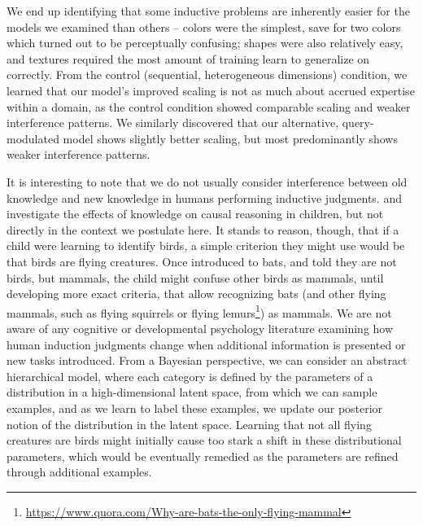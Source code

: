 We end up identifying that some inductive problems are inherently easier for the models we examined than others -- colors were the simplest, save for two colors which turned out to be perceptually confusing; shapes were also relatively easy, and textures required the most amount of training learn to generalize on correctly. From the control (sequential, heterogeneous dimensions) condition, we learned that our model's improved scaling is not as much about accrued expertise within a domain, as the control condition showed comparable scaling and weaker interference patterns. We similarly discovered that our alternative, query-modulated model shows slightly better scaling, but most predominantly shows weaker interference patterns. 

It is interesting to note that we do not usually consider interference between old knowledge and new knowledge in humans performing inductive judgments. \textcite{Gopnik} and \textcite{Griffiths2011} investigate the effects of knowledge on causal reasoning in children, but not directly in the context we postulate here. It stands to reason, though, that if a child were learning to identify birds, a simple criterion they might use would be that birds are flying creatures. Once introduced to bats, and told they are not birds, but mammals, the child might confuse other birds as mammals, until developing more exact criteria, that allow recognizing bats (and other flying mammals, such as flying squirrels or flying lemurs\footnote{\url{https://www.quora.com/Why-are-bats-the-only-flying-mammal}}) as mammals. We are not aware of any cognitive or developmental psychology literature examining how human induction judgments change when additional information is presented or new tasks introduced. From a Bayesian perspective, we can consider an abstract hierarchical model, where each category is defined by the parameters of a distribution in a high-dimensional latent space, from which we can sample examples, and as we learn to label these examples, we update our posterior notion of the distribution in the latent space. Learning that not all flying creatures are birds might initially cause too stark a shift in these distributional parameters, which would be eventually remedied as the parameters are refined through additional examples. 


